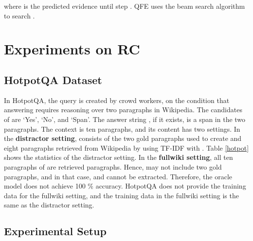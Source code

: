 \documentclass[11pt,a4paper]{article}
\theoremstyle{definition}
\begin{document}
	where  is the predicted evidence until step .
	QFE uses the beam search algorithm 
	to search .

	\section{Experiments on RC}
	\label{sec:RC}
	\subsection{HotpotQA Dataset}	
	In HotpotQA, the query  is created by crowd workers, on the condition that answering  requires reasoning over two paragraphs in Wikipedia. The candidates of  are `Yes', `No', and `Span'. The answer string , if it exists, is a span in the two paragraphs. 
	The context  is ten paragraphs, and its content has two settings. In the \textbf{distractor setting},  consists of the two gold paragraphs used to create  and eight paragraphs retrieved from Wikipedia by using TF-IDF with .
	Table \ref{hotpot} shows the statistics of the distractor setting.
	In the \textbf{fullwiki setting}, all ten paragraphs of  are retrieved paragraphs. Hence,  may not include two gold paragraphs, and in that case,  and  cannot be extracted. 
	Therefore, the oracle model does not achieve 100 \% accuracy.
	HotpotQA does not provide the training data for the fullwiki setting, and the training data in the fullwiki setting is the same as the distractor setting.
	
	\begin{table}[t]
	\begin{center}
	\end{center}\caption{Statistics of HotpotQA (the development set in the distractor setting).}\label{hotpot}
	\end{table}

	\subsection{Experimental Setup}
	
\end{document}
